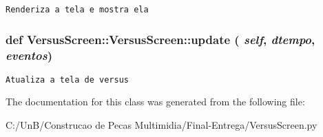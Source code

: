 \begin{footnotesize}\begin{verbatim}Renderiza a tela e mostra ela\end{verbatim}
\end{footnotesize}
 \hypertarget{class_versus_screen_1_1_versus_screen_9a1411490a4e57b8a7d2003d12acea23}{
\subsubsection[{update}]{\setlength{\rightskip}{0pt plus 5cm}def VersusScreen::VersusScreen::update ( {\em self}, \/   {\em dtempo}, \/   {\em eventos})}}
\label{class_versus_screen_1_1_versus_screen_9a1411490a4e57b8a7d2003d12acea23}




\begin{footnotesize}\begin{verbatim}Atualiza a tela de versus\end{verbatim}
\end{footnotesize}
 

The documentation for this class was generated from the following file:\begin{CompactItemize}
\item 
C:/UnB/Construcao de Pecas Multimidia/Final-Entrega/VersusScreen.py\end{CompactItemize}
